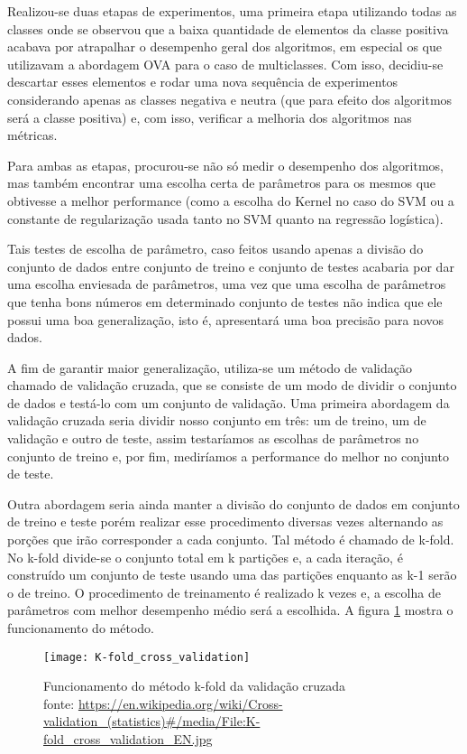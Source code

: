 Realizou-se duas etapas de experimentos, uma primeira etapa utilizando todas as classes onde se
observou que a baixa quantidade de elementos da classe positiva acabava por atrapalhar o desempenho
geral dos algoritmos, em especial os que utilizavam a abordagem OVA para o caso de multiclasses.
Com isso, decidiu-se descartar esses elementos e rodar uma nova sequência de experimentos 
considerando apenas as classes negativa e neutra (que para efeito dos algoritmos será a classe 
positiva) e, com isso, verificar a melhoria dos algoritmos nas métricas.

Para ambas as etapas, procurou-se não só medir o desempenho dos algoritmos, mas também encontrar
uma escolha certa de parâmetros para os mesmos que obtivesse a melhor performance (como a escolha
do Kernel no caso do SVM ou a constante de regularização usada tanto no SVM quanto na regressão
logística).

Tais testes de escolha de parâmetro, caso feitos usando apenas a divisão do conjunto de dados entre
conjunto de treino e conjunto de testes acabaria por dar uma escolha enviesada de parâmetros, uma
vez que uma escolha de parâmetros que tenha bons números em determinado conjunto de testes não
indica que ele possui uma boa generalização, isto é, apresentará uma boa precisão para novos dados.

A fim de garantir maior generalização, utiliza-se um método de validação chamado de 
validação cruzada, que se consiste de um modo de dividir o conjunto de dados e testá-lo com
um conjunto de validação. Uma primeira abordagem da validação cruzada seria dividir nosso conjunto
em três: um de treino, um de validação e outro de teste, assim testaríamos as escolhas de parâmetros
no conjunto de treino e, por fim, mediríamos a performance do melhor no conjunto de teste.

Outra abordagem seria ainda manter a divisão do conjunto de dados em conjunto de treino e teste
porém realizar esse procedimento diversas vezes alternando as porções que irão corresponder a
cada conjunto. Tal método é chamado de k-fold. No k-fold divide-se o conjunto total em k partições
e, a cada iteração, é construído um conjunto de teste usando uma das partições enquanto as k-1
serão o de treino. O procedimento de treinamento é realizado k vezes e, a escolha de parâmetros
com melhor desempenho médio será a escolhida. A figura \ref{fig:kfold} mostra o funcionamento do
método.

\begin{figure}[H]
	\begin{center}
		\texttt{[image: K-fold\_cross\_validation]}
	\end{center}		
	\caption{Funcionamento do método k-fold da validação cruzada \\
		fonte: \url{https://en.wikipedia.org/wiki/Cross-validation_(statistics)\#/media/File:K-fold_cross_validation_EN.jpg}}
	\label{fig:kfold}
\end{figure}


